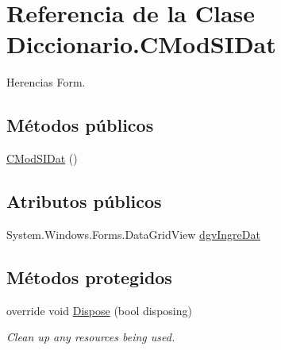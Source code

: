\hypertarget{class_diccionario_1_1_c_mod_s_i_dat}{\section{Referencia de la Clase Diccionario.\-C\-Mod\-S\-I\-Dat}
\label{class_diccionario_1_1_c_mod_s_i_dat}
}


Herencias Form.

\subsection*{Métodos públicos}
\begin{DoxyCompactItemize}
\item 
\hyperlink{class_diccionario_1_1_c_mod_s_i_dat_ad1aa9dcbbf8a4b59a64177a07978c417}{C\-Mod\-S\-I\-Dat} ()
\end{DoxyCompactItemize}
\subsection*{Atributos públicos}
\begin{DoxyCompactItemize}
\item 
System.\-Windows.\-Forms.\-Data\-Grid\-View \hyperlink{class_diccionario_1_1_c_mod_s_i_dat_a20d8d78b9684818868d4404bd026d436}{dgv\-Ingre\-Dat}
\end{DoxyCompactItemize}
\subsection*{Métodos protegidos}
\begin{DoxyCompactItemize}
\item 
override void \hyperlink{class_diccionario_1_1_c_mod_s_i_dat_aa76c12dd73ffcc356f47b2dcc722f6e3}{Dispose} (bool disposing)
\begin{DoxyCompactList}\small\item\em Clean up any resources being used. \end{DoxyCompactList}\end{DoxyCompactItemize}
